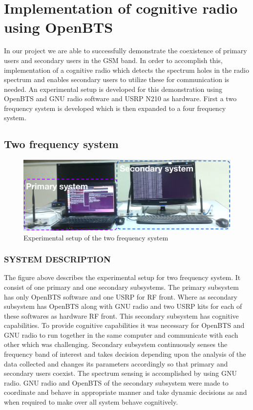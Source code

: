 \chapter{Implementation of cognitive radio using OpenBTS}

In our project we are able to successfully demonstrate the coexistence of 
primary users and secondary users in the GSM band. In order to accomplish this, 
implementation of a cognitive radio which detects the spectrum holes in the 
radio spectrum and enables secondary users to utilize these for communication 
is needed. An experimental setup is developed for this demonstration using 
OpenBTS and GNU radio software and USRP N210 as hardware. First a two frequency 
system is developed which is then expanded to a four frequency system.


\section{Two frequency system}

\begin{figure}
\centering
\includegraphics[width=1\textwidth]{../images/freq2}
\caption[Experimental setup, 2-frequency system]{Experimental setup of the two
 frequency system}
\label{freq2}
\end{figure}


\subsection{SYSTEM DESCRIPTION}
The figure above describes the experimental setup for two frequency system. It 
consist of one primary and one secondary subsystems. The primary subsystem has 
only OpenBTS software and one USRP for RF front. Where as secondary subsystem 
has OpenBTS along with GNU radio and two USRP kits for each of these softwares 
as hardware RF front. This secondary subsystem has cognitive capabilities. To 
provide cognitive capabilities it was necessary for OpenBTS and GNU radio to run 
together in the same computer and communicate with each other which was challenging. 
Secondary subsystem continuously senses the frequency band of interest and  
takes decision depending upon the analysis of the data collected and changes 
its parameters accordingly so that primary and secondary users coexist. The 
spectrum sensing is accomplished by using GNU radio.  GNU radio and 
OpenBTS of the secondary subsystem were made to coordinate and behave in appropriate manner and take dynamic decisions 
as and when required to make over all system behave cognitively.

